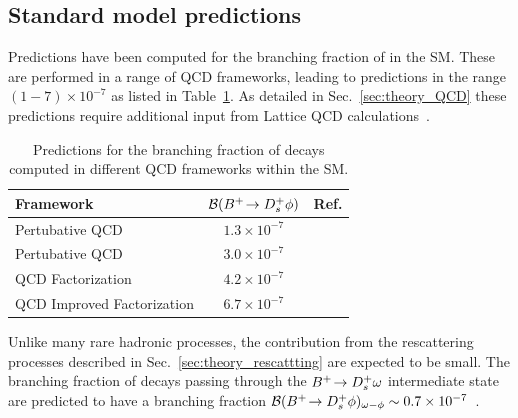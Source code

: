 \subsection{Standard model predictions}
Predictions have been computed for the branching fraction of \decay{\Bp}{\Dsp\phiz} in the SM.  
These are performed in a range of QCD frameworks, leading to predictions in the range $(1-7)\times10^{-7}$ as listed in Table~\ref{tab:theory_predicted_br}. As detailed in Sec.~\ref{sec:theory_QCD} these predictions require additional input from Lattice QCD calculations~\cite{fB:2013HPQCD,fB:2016ETM, fB:2016Fermi}.  
\begin{table}[h]
    \centering
    \begin{tabular}{ l c c }
        \hline
        Framework                      & ${\mathcal{B}}({{{B}^+}}\!\rightarrow {\ensuremath{{D}^+_{s}}}\phi)$           & Ref.                       \\
        \hline
        Pertubative QCD                & $1.3\times10^{-7}$    & ~\cite{Zou:2009zza}        \\
        Pertubative QCD                & $3.0\times10^{-7}$    & ~\cite{Lu:2001yz}          \\
        QCD Factorization              & $4.2\times10^{-7}$    & ~\cite{Mohanta:2007uu}     \\
        QCD Improved Factorization     & $6.7\times10^{-7}$    & ~\cite{Mohanta:2002wf}     \\
        \hline 
    \end{tabular}
   \caption{Predictions for the branching fraction of \decay{\Bp}{\Dsp\phiz} decays computed in different QCD frameworks within the SM.}
   \label{tab:theory_predicted_br}
\end{table}

Unlike many rare hadronic processes, the contribution from the rescattering processes described in Sec.~\ref{sec:theory_rescattting} are expected to be small. The branching fraction of decays passing through the ${{{B}^+}}\!\rightarrow {\ensuremath{{D}^+_{s}}}\omega$ intermediate state are predicted to have a branching fraction ${\mathcal{B}}({{{B}^+}}\!\rightarrow {\ensuremath{{D}^+_{s}}}\phi)_{\omega-\phi}\sim 0.7\times10^{-7}$~\cite{Gronau:2012gs}. 



